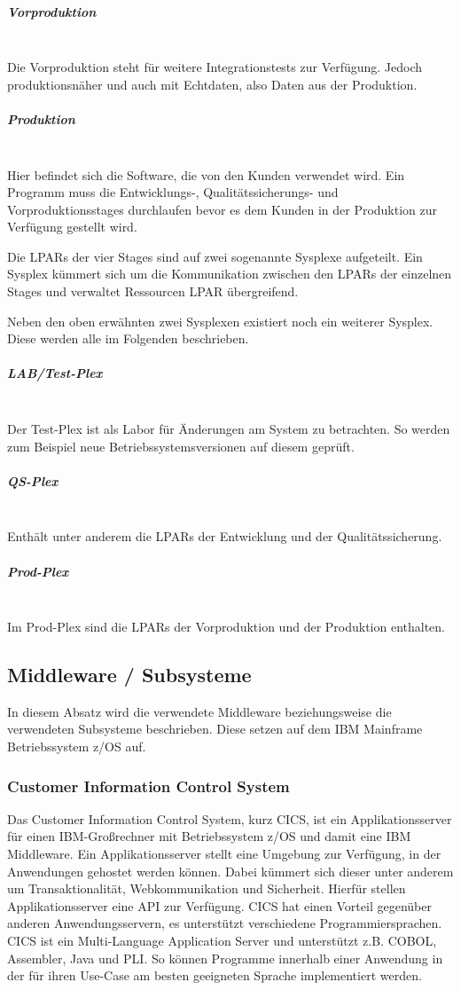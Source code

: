 \subparagraph{\glqq Vorproduktion\grqq}~\\
Die Vorproduktion steht für weitere Integrationstests zur Verfügung.
Jedoch produktionsnäher und auch mit Echtdaten, also Daten aus der Produktion.

\subparagraph{\glqq Produktion\grqq}~\\
Hier befindet sich die Software, die von den Kunden verwendet wird.
Ein Programm muss die Entwicklungs-, Qualitätssicherungs- und Vorproduktionsstages durchlaufen bevor es dem Kunden in der Produktion zur Verfügung gestellt wird.

Die LPARs der vier Stages sind auf zwei sogenannte  \glqq Sysplexe\grqq{} aufgeteilt.
Ein Sysplex kümmert sich um die Kommunikation zwischen den LPARs der einzelnen Stages und verwaltet Ressourcen LPAR übergreifend.
\cite{Kyne.2016}

Neben den oben erwähnten zwei Sysplexen existiert noch ein weiterer Sysplex.
Diese werden alle im Folgenden beschrieben.

\subparagraph{\glqq LAB/Test-Plex\grqq}~\\
Der Test-Plex ist als Labor für Änderungen am System zu betrachten.
So werden zum Beispiel neue Betriebssystemsversionen auf diesem geprüft.

\subparagraph{\glqq QS-Plex\grqq}~\\
Enthält unter anderem die LPARs der Entwicklung und der Qualitätssicherung.

\subparagraph{\glqq Prod-Plex\grqq}~\\
Im Prod-Plex sind die LPARs der Vorproduktion und der Produktion enthalten.

\subsection{Middleware / Subsysteme}
In diesem Absatz wird die verwendete Middleware beziehungsweise die verwendeten Subsysteme beschrieben.
Diese setzen auf dem IBM Mainframe Betriebssystem z/OS auf.

\subsubsection{Customer Information Control System}\label{cics}
Das Customer Information Control System, kurz CICS, ist ein Applikationsserver für einen IBM-Großrechner mit Betriebssystem z/OS und damit eine IBM Middleware.
Ein Applikationsserver stellt eine Umgebung zur Verfügung, in der Anwendungen gehostet werden können.
Dabei kümmert sich dieser unter anderem um Transaktionalität, Webkommunikation und Sicherheit.
Hierfür stellen Applikationsserver eine API zur Verfügung.
CICS hat einen Vorteil gegenüber anderen Anwendungsservern, es unterstützt verschiedene Programmiersprachen.
CICS ist ein Multi-Language Application Server und unterstützt z.B. COBOL, Assembler, Java und PLI.
So können Programme innerhalb einer Anwendung in der für ihren Use-Case am besten geeigneten Sprache implementiert werden.
\cite{Rayns.2011}

